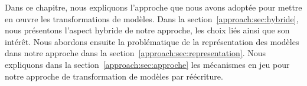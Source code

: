 

Dans ce chapitre, nous expliquons l'approche que nous avons adoptée pour mettre
en œuvre les transformations de modèles. Dans la
section~\ref{approach:sec:hybride}, nous présentons l'aspect hybride de notre
approche, les choix liés ainsi que son intérêt. Nous abordons ensuite la
problématique de la représentation des modèles dans notre approche dans la
section~\ref{approach:sec:representation}. Nous expliquons dans la
section~\ref{approach:sec:approche} les mécanismes en jeu pour notre approche
de transformation de modèles par réécriture.


